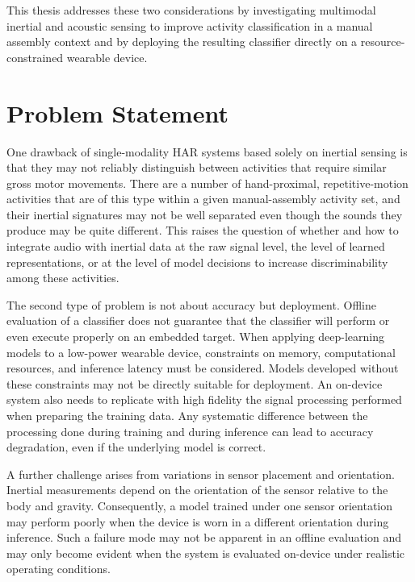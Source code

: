 This thesis addresses these two considerations by investigating multimodal inertial and acoustic sensing to improve activity classification in a manual assembly context and by deploying the resulting classifier directly on a resource-constrained wearable device.


\section{Problem Statement}

One drawback of single-modality HAR systems based solely on inertial sensing is that they may not reliably distinguish between activities that require similar gross motor movements. There are a number of hand-proximal, repetitive-motion activities that are of this type within a given manual-assembly activity set, and their inertial signatures may not be well separated even though the sounds they produce may be quite different. This raises the question of whether and how to integrate audio with inertial data at the raw signal level, the level of learned representations, or at the level of model decisions to increase discriminability among these activities.

The second type of problem is not about accuracy but deployment. Offline evaluation of a classifier does not guarantee that the classifier will perform or even execute properly on an embedded target. When applying deep-learning models to a low-power wearable device, constraints on memory, computational resources, and inference latency must be considered. Models developed without these constraints may not be directly suitable for deployment. An on-device system also needs to replicate with high fidelity the signal processing performed when preparing the training data. Any systematic difference between the processing done during training and during inference can lead to accuracy degradation, even if the underlying model is correct.

A further challenge arises from variations in sensor placement and orientation. Inertial measurements depend on the orientation of the sensor relative to the body and gravity. Consequently, a model trained under one sensor orientation may perform poorly when the device is worn in a different orientation during inference. Such a failure mode may not be apparent in an offline evaluation and may only become evident when the system is evaluated on-device under realistic operating conditions.

